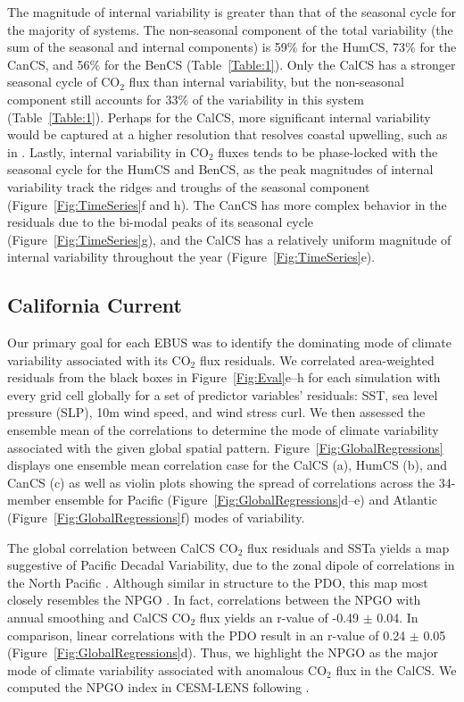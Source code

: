 \documentclass[hvmath, online,bgd]{copernicus_discussions}
\begin{document}
The magnitude of internal variability is greater than that of the seasonal cycle for the majority of systems. The non-seasonal component of the total variability (the sum of the seasonal and internal components) is 59\% for the HumCS, 73\% for the CanCS, and 56\% for the BenCS (Table~\ref{Table:1}). Only the CalCS has a stronger seasonal cycle of CO$_{2}$ flux than internal variability, but the non-seasonal component still accounts for 33\% of the variability in this system (Table~\ref{Table:1}). Perhaps for the CalCS, more significant internal variability would be captured at a higher resolution that resolves coastal upwelling, such as in \citet[][Figure~8c]{Turi:2014}. Lastly, internal variability in CO$_{2}$ fluxes tends to be phase-locked with the seasonal cycle for the HumCS and BenCS, as the peak magnitudes of internal variability track the ridges and troughs of the seasonal component (Figure~\ref{Fig:TimeSeries}f and h). The CanCS has more complex behavior in the residuals due to the bi-modal peaks of its seasonal cycle (Figure~\ref{Fig:TimeSeries}g), and the CalCS has a relatively uniform magnitude of internal variability throughout the year (Figure~\ref{Fig:TimeSeries}e).

\subsection{California Current}
Our primary goal for each EBUS was to identify the dominating mode of climate variability associated with its CO$_{2}$ flux residuals. We correlated area-weighted residuals from the black boxes in Figure~\ref{Fig:Eval}e--h for each simulation with every grid cell globally for a set of predictor variables' residuals: SST, sea level pressure (SLP), 10m wind speed, and wind stress curl. We then assessed the ensemble mean of the correlations to determine the mode of climate variability associated with the given global spatial pattern. Figure~\ref{Fig:GlobalRegressions} displays one ensemble mean correlation case for the CalCS (a), HumCS (b), and CanCS (c) as well as violin plots showing the spread of correlations across the 34-member ensemble for Pacific (Figure~\ref{Fig:GlobalRegressions}d--e) and Atlantic (Figure~\ref{Fig:GlobalRegressions}f) modes of variability.

The global correlation between CalCS CO$_{2}$ flux residuals and SSTa yields a map suggestive of Pacific Decadal Variability, due to the zonal dipole of correlations in the North Pacific \citep[Figure~\ref{Fig:GlobalRegressions}a;][]{Mantua:2002,DiLorenzo:2008}. Although similar in structure to the PDO, this map most closely resembles the NPGO \citep{DiLorenzo:2008}. In fact, correlations between the NPGO with annual smoothing and CalCS CO$_{2}$ flux yields an r-value of -0.49 $\pm$ 0.04. In comparison, linear correlations with the PDO result in an r-value of 0.24 $\pm$ 0.05 (Figure~\ref{Fig:GlobalRegressions}d). Thus, we highlight the NPGO as the major mode of climate variability associated with anomalous CO$_{2}$ flux in the CalCS. We computed the NPGO index in CESM-LENS following \citet{DiLorenzo:2016}.
\end{document}
